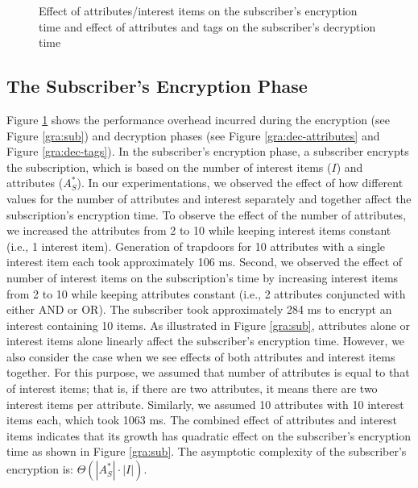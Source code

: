 \documentclass[epsfig,a4paper,11pt,titlepage]{book}
\numberwithin{algorithm}{chapter}
\begin{document}
\begin{figure}
\centering


\caption[Effect of attributes/items on the subscriber's encryption/decryption time]{Effect of  attributes/interest items on the subscriber's encryption time and effect of  attributes and  tags on the subscriber's decryption time}
\label{fig:pidgin-sub-enc-dec}
\end{figure}


\subsection{The Subscriber's Encryption Phase}
Figure \ref{fig:pidgin-sub-enc-dec} shows the performance overhead incurred during the encryption (see Figure \ref{gra:sub}) and decryption phases (see Figure \ref{gra:dec-attributes} and Figure \ref{gra:dec-tags}). In the subscriber's encryption phase, a subscriber encrypts the subscription, which is based on the number of interest items ($I$) and attributes ($A_S^*$). In our experimentations, we observed the effect of how different values for the number of attributes and interest separately and together affect the subscription's encryption time. To observe the effect of the number of attributes, we increased the attributes from 2 to 10 while keeping interest items constant (i.e., 1 interest item). Generation of trapdoors for 10 attributes with a single interest item each took approximately 106 \gls{ms}. Second, we observed the effect of number of interest items on the subscription's time by increasing interest items from 2 to 10 while keeping attributes constant (i.e., 2 attributes conjuncted with either AND or OR). The subscriber took approximately 284 \gls{ms} to encrypt an interest containing 10 items. As illustrated in Figure \ref{gra:sub}, attributes alone or interest items alone linearly affect the subscriber's encryption time. However, we also consider the case when we see effects of both attributes and interest items together. For this purpose, we assumed that number of attributes is equal to that of interest items; that is, if there are two attributes, it means there are two interest items per attribute. Similarly, we assumed 10 attributes with 10 interest items each, which took 1063 \gls{ms}. The combined effect of attributes and interest items indicates that its growth has quadratic effect on the subscriber's encryption time as shown in Figure \ref{gra:sub}. The asymptotic complexity of the subscriber's encryption is: ${\Theta}(|A_S^*| \cdot |I|)$.
\end{document}
